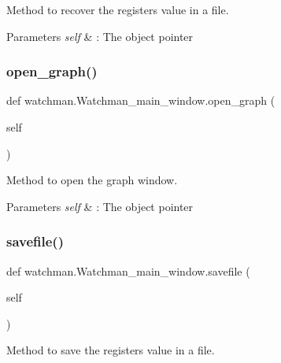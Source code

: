 Method to recover the register\textquotesingle{}s value in a file. 


\begin{DoxyParams}{Parameters}
{\em self} & \+: The object pointer \\
\hline
\end{DoxyParams}
\mbox{\label{classwatchman_1_1_watchman__main__window_a99d6e254c6da829ebe7b2798806af3bf}} 
\subsubsection{\texorpdfstring{open\_graph()}{open\_graph()}}
{\footnotesize\ttfamily def watchman.\+Watchman\+\_\+main\+\_\+window.\+open\+\_\+graph (\begin{DoxyParamCaption}\item[{}]{self }\end{DoxyParamCaption})}



Method to open the graph window. 


\begin{DoxyParams}{Parameters}
{\em self} & \+: The object pointer \\
\hline
\end{DoxyParams}
\mbox{\label{classwatchman_1_1_watchman__main__window_a5f2f0684e828492369f1e11c50192dc3}} 
\subsubsection{\texorpdfstring{savefile()}{savefile()}}
{\footnotesize\ttfamily def watchman.\+Watchman\+\_\+main\+\_\+window.\+savefile (\begin{DoxyParamCaption}\item[{}]{self }\end{DoxyParamCaption})}



Method to save the register\textquotesingle{}s value in a file. 


